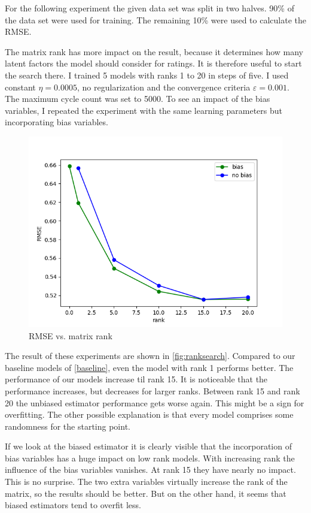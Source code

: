 \documentclass[DIV=14,twocolumn]{scrartcl}
\begin{document}
For the following experiment the given data set was split in two halves. 90\% of the data set were used for training. The remaining 10\% were used to calculate the RMSE. 

The matrix rank has more impact on the result, because it determines how many latent factors the model should consider for ratings. It is therefore useful to start the search there. I trained 5 models with ranks 1 to 20 in steps of five. I used constant $\eta=0.0005$, no regularization and the convergence criteria $\varepsilon = 0.001$. The maximum cycle count was set to 5000. To see an impact of the bias variables, I repeated the experiment with the same learning parameters but incorporating bias variables.  
\begin{figure}[h]
	\includegraphics[width=\columnwidth]{../img/rank-rmse-validate}
	\caption{RMSE vs. matrix rank}
	\label{fig:ranksearch}
\end{figure}
The result of these experiments are shown in \autoref{fig:ranksearch}. Compared to our baseline models of \autoref{baseline}, even the model with rank 1 performs better. The performance of our models increase til rank 15. It is noticeable that the performance increases, but decreases for larger ranks.
Between rank 15 and rank 20 the unbiased estimator performance gets worse again. This might be a sign for overfitting. The other possible explanation is that every model comprises some randomness for the starting point. 
 
If we look at the biased estimator it is clearly visible that the incorporation of bias variables has a huge impact on low rank models. With increasing rank the influence of the bias variables vanishes. At rank 15 they have nearly no impact. 
This is no surprise. The two extra variables virtually increase the rank of the matrix, so the results should be better.
But on the other hand, it seems that biased estimators tend to overfit less.
\end{document}
